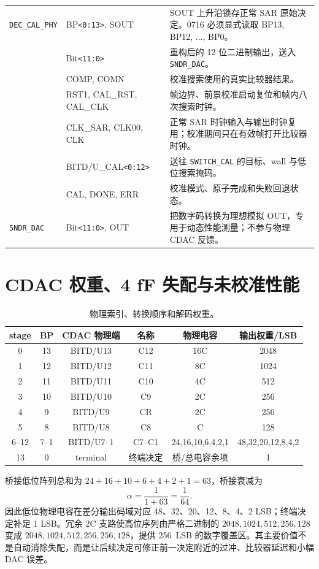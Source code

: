 \documentclass[UTF8,a4paper,11pt]{ctexart}
\newcommand{\code}[1]{\texttt{#1}}
\begin{document}
\begin{longtable}{p{}p{}p{}}
\midrule
\code{DEC\_CAL\_PHY} & BP\code{<0:13>}, SOUT & SOUT 上升沿锁存正常 SAR 原始决定。0716 必须显式读取 BP13, BP12, ..., BP0。 \\
 & Bit\code{<11:0>} & 重构后的 12 位二进制输出，送入 \code{SNDR\_DAC}。 \\
 & COMP, COMN & 校准搜索使用的真实比较器结果。 \\
 & RST1, CAL\_RST, CAL\_CLK & 帧边界、前景校准启动复位和帧内八次搜索时钟。 \\
 & CLK\_SAR, CLK00, CLK & 正常 SAR 时钟输入与输出时钟复用；校准期间只在有效帧打开比较器时钟。 \\
 & BITD/U\_CAL\code{<0:12>} & 送往 \code{SWITCH\_CAL} 的目标、wall 与低位搜索掩码。 \\
 & CAL, DONE, ERR & 校准模式、原子完成和失败回退状态。 \\
\midrule
\code{SNDR\_DAC} & Bit\code{<11:0>}, OUT & 把数字码转换为理想模拟 OUT，专用于动态性能测量；不参与物理 CDAC 反馈。 \\
\bottomrule
\end{longtable}

\section{CDAC 权重、4 fF 失配与未校准性能}

\begin{table}[H]
\centering
\caption{物理索引、转换顺序和解码权重。}
\label{tab:mapping}
\small
\begin{tabular}{cccccc}
\toprule
stage & BP & CDAC 物理端 & 名称 & 物理电容 & 输出权重/LSB \\
\midrule
0 & 13 & BITD/U13 & C12 & 16C & 2048 \\
1 & 12 & BITD/U12 & C11 & 8C & 1024 \\
2 & 11 & BITD/U11 & C10 & 4C & 512 \\
3 & 10 & BITD/U10 & C9 & 2C & 256 \\
4 & 9 & BITD/U9 & CR & 2C & 256 \\
5 & 8 & BITD/U8 & C8 & C & 128 \\
6--12 & 7--1 & BITD/U7--1 & C7--C1 & 24,16,10,6,4,2,1 & 48,32,20,12,8,4,2 \\
13 & 0 & terminal & 终端决定 & 桥/总电容余项 & 1 \\
\bottomrule
\end{tabular}
\end{table}

桥接低位阵列总和为 $24+16+10+6+4+2+1=63$，桥接衰减为
\[
\alpha=\frac{1}{1+63}=\frac{1}{64}.
\]
因此低位物理电容在差分输出码域对应 48、32、20、12、8、4、2 LSB；终端决定补足 1 LSB。冗余 2C 支路使高位序列由严格二进制的 $2048,1024,512,256,128$ 变成 $2048,1024,512,256,256,128$，提供 \SI{256}{LSB} 的数字覆盖区。其主要价值不是自动消除失配，而是让后续决定可修正前一决定附近的过冲、比较器延迟和小幅 DAC 误差。
\end{document}
